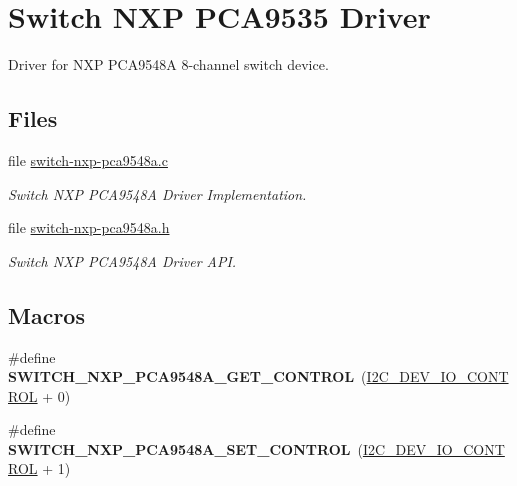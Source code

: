 \hypertarget{group__I2CSWITCHNXPPCA9548A}{}\section{Switch N\+XP P\+C\+A9535 Driver}
\label{group__I2CSWITCHNXPPCA9548A}


Driver for N\+XP P\+C\+A9548A 8-\/channel switch device.  


\subsection*{Files}
\begin{DoxyCompactItemize}
\item 
file \mbox{\hyperlink{switch-nxp-pca9548a_8c}{switch-\/nxp-\/pca9548a.\+c}}
\begin{DoxyCompactList}\small\item\em Switch N\+XP P\+C\+A9548A Driver Implementation. \end{DoxyCompactList}\item 
file \mbox{\hyperlink{switch-nxp-pca9548a_8h}{switch-\/nxp-\/pca9548a.\+h}}
\begin{DoxyCompactList}\small\item\em Switch N\+XP P\+C\+A9548A Driver A\+PI. \end{DoxyCompactList}\end{DoxyCompactItemize}
\subsection*{Macros}
\begin{DoxyCompactItemize}
\item 
\mbox{\label{group__I2CSWITCHNXPPCA9548A_ga841ef890cee594db19d8d1d2964efad8}} 
\#define {\bfseries S\+W\+I\+T\+C\+H\+\_\+\+N\+X\+P\+\_\+\+P\+C\+A9548\+A\+\_\+\+G\+E\+T\+\_\+\+C\+O\+N\+T\+R\+OL}~(\mbox{\hyperlink{group__I2CDevice_gae8b74d1b5fc16a9c31e4da115b0ab004}{I2\+C\+\_\+\+D\+E\+V\+\_\+\+I\+O\+\_\+\+C\+O\+N\+T\+R\+OL}} + 0)
\item 
\mbox{\label{group__I2CSWITCHNXPPCA9548A_ga7c66fae0a0cf03a6ee8e4cd880cede2f}} 
\#define {\bfseries S\+W\+I\+T\+C\+H\+\_\+\+N\+X\+P\+\_\+\+P\+C\+A9548\+A\+\_\+\+S\+E\+T\+\_\+\+C\+O\+N\+T\+R\+OL}~(\mbox{\hyperlink{group__I2CDevice_gae8b74d1b5fc16a9c31e4da115b0ab004}{I2\+C\+\_\+\+D\+E\+V\+\_\+\+I\+O\+\_\+\+C\+O\+N\+T\+R\+OL}} + 1)
\end{DoxyCompactItemize}
